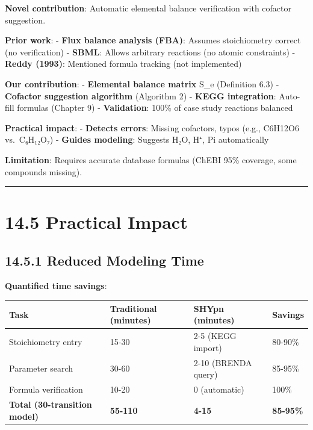 \textbf{Novel contribution}: Automatic elemental balance verification
with cofactor suggestion.

\textbf{Prior work}: - \textbf{Flux balance analysis (FBA)}: Assumes
stoichiometry correct (no verification) - \textbf{SBML}: Allows
arbitrary reactions (no atomic constraints) - \textbf{Reddy (1993)}:
Mentioned formula tracking (not implemented)

\textbf{Our contribution}: - \textbf{Elemental balance matrix} S\_e
(Definition 6.3) - \textbf{Cofactor suggestion algorithm} (Algorithm 2)
- \textbf{KEGG integration}: Auto-fill formulas (Chapter 9) -
\textbf{Validation}: 100\% of case study reactions balanced

\textbf{Practical impact}: - \textbf{Detects errors}: Missing cofactors,
typos (e.g., C6H12O6 vs.~C₆H₁₂O₇) - \textbf{Guides modeling}: Suggests
H₂O, H⁺, Pi automatically

\textbf{Limitation}: Requires accurate database formulas (ChEBI 95\%
coverage, some compounds missing).

\begin{center}\rule{0.5\linewidth}{0.5pt}\end{center}

\hypertarget{practical-impact}{%
\section{14.5 Practical Impact}\label{practical-impact}}

\hypertarget{reduced-modeling-time}{%
\subsection{14.5.1 Reduced Modeling Time}\label{reduced-modeling-time}}

\textbf{Quantified time savings}:

\begin{longtable}[]{@{}llll@{}}
\toprule\noalign{}
Task & Traditional (minutes) & SHYpn (minutes) & Savings \\
\midrule\noalign{}
\endhead
\bottomrule\noalign{}
\endlastfoot
Stoichiometry entry & 15-30 & 2-5 (KEGG import) & 80-90\% \\
Parameter search & 30-60 & 2-10 (BRENDA query) & 85-95\% \\
Formula verification & 10-20 & 0 (automatic) & 100\% \\
\textbf{Total (30-transition model)} & \textbf{55-110} & \textbf{4-15} &
\textbf{85-95\%} \\
\end{longtable}

